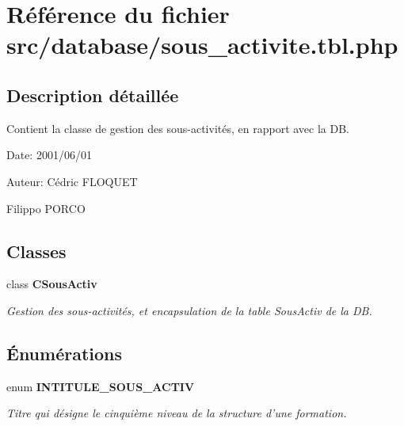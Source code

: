 \section{Référence du fichier src/database/sous\_\-activite.tbl.php}
\label{sous__activite_8tbl_8php}


\subsection{Description détaillée}
Contient la classe de gestion des sous-activités, en rapport avec la DB. 

\begin{Desc}
\item[Date:]2001/06/01\end{Desc}
\begin{Desc}
\item[Auteur:]Cédric FLOQUET 

Filippo PORCO \end{Desc}


\subsection*{Classes}
\begin{CompactItemize}
\item 
class {\bf CSousActiv}
\begin{CompactList}\small\item\em Gestion des sous-activités, et encapsulation de la table SousActiv de la DB. \item\end{CompactList}\end{CompactItemize}
\subsection*{Énumérations}
\begin{CompactItemize}
\item 
enum {\bf INTITULE\_\-SOUS\_\-ACTIV} 
\begin{CompactList}\small\item\em Titre qui désigne le cinquième niveau de la structure d'une formation. \item\end{CompactList}\end{CompactItemize}
